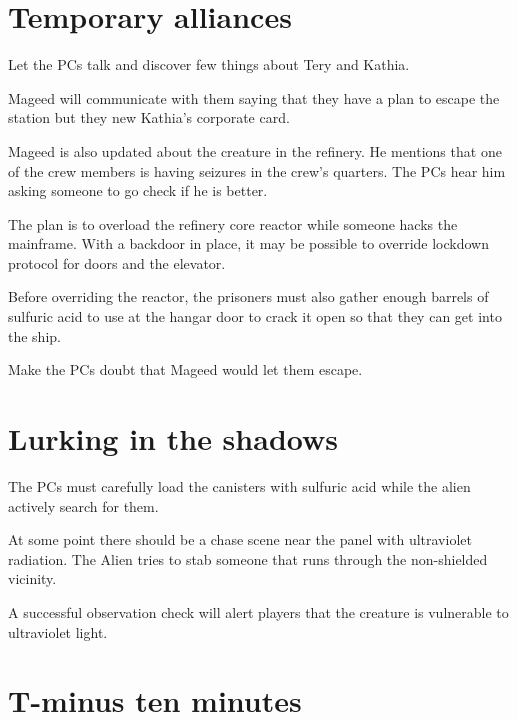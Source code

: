 \newchap


\section{Temporary alliances}


\begin{rpg-commentbox}{}

\end{rpg-commentbox}

Let the PCs talk and discover few things about Tery and Kathia. 

Mageed will communicate with them saying that they have a plan to escape the station but they new Kathia's corporate card. 

Mageed is also updated about the creature in the refinery. He mentions that one of the crew members is having seizures in the crew's quarters. The PCs hear him asking someone to go check if he is better.


The plan is to overload the refinery core reactor while someone hacks the mainframe. With a backdoor in place, it may be possible to override lockdown protocol for doors and the elevator. 


Before overriding the reactor, the prisoners must also gather enough barrels of sulfuric acid to use at the hangar door to crack it open so that they can get into the ship.


Make the PCs doubt that Mageed would let them escape.

\newsect

\section{Lurking in the shadows}


\begin{rpg-commentbox}{}

\end{rpg-commentbox}

The PCs must carefully load the canisters with sulfuric acid while the alien actively search for them. 

At some point there should be a chase scene near the panel with ultraviolet radiation. The Alien tries to stab someone that runs through the non-shielded vicinity. 

A successful observation check will alert players that the creature is vulnerable to ultraviolet light.




\section{T-minus ten minutes}


